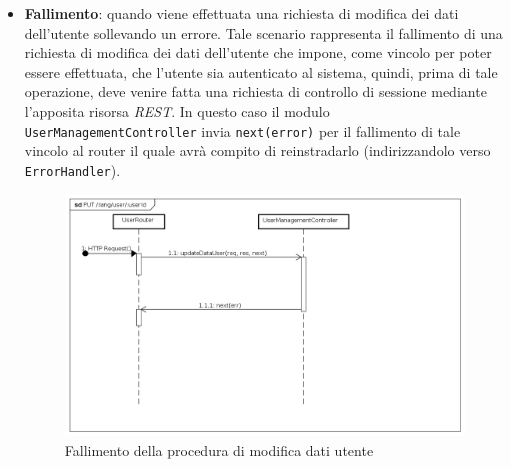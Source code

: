 \begin{itemize}
\item \textbf{Fallimento}: quando viene effettuata una richiesta di modifica dei dati dell'utente sollevando un errore. Tale scenario rappresenta il fallimento di una richiesta di modifica dei dati dell'utente che impone, come vincolo per poter essere effettuata, che l'utente sia autenticato al sistema, quindi, prima di tale operazione, deve venire fatta una richiesta di controllo di sessione mediante l'apposita risorsa \textit{REST}. In questo caso il modulo \texttt{UserManagementController} invia \texttt{next(error)} per il fallimento di tale vincolo al router il quale avrà compito di reinstradarlo (indirizzandolo verso \texttt{ErrorHandler}).
\label{Fallimento della procedura di modifica dati utente}
\begin{figure}[ht]
	\centering
	\includegraphics[scale=0.40]{UML/DiagrammiDiSequenza/Back-end/PUT_LangUserUseridFailure.png}
	
	\caption{Fallimento della procedura di modifica dati utente}
\end{figure}
\FloatBarrier
\end{itemize}

